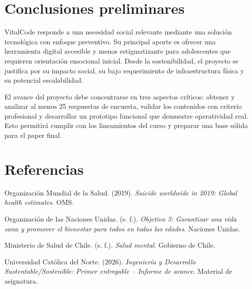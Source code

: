 \documentclass[12pt,letterpaper]{article}
\begin{document}
\section{Conclusiones preliminares}

VitalCode responde a una necesidad social relevante mediante una solución tecnológica con enfoque preventivo. Su principal aporte es ofrecer una herramienta digital accesible y menos estigmatizante para adolescentes que requieren orientación emocional inicial. Desde la sostenibilidad, el proyecto se justifica por su impacto social, su bajo requerimiento de infraestructura física y su potencial escalabilidad.

El avance del proyecto debe concentrarse en tres aspectos críticos: obtener y analizar al menos 25 respuestas de encuesta, validar los contenidos con criterio profesional y desarrollar un prototipo funcional que demuestre operatividad real. Esto permitirá cumplir con los lineamientos del curso y preparar una base sólida para el paper final.

\newpage
\section*{Referencias}

Organización Mundial de la Salud. (2019). \textit{Suicide worldwide in 2019: Global health estimates}. OMS.

Organización de las Naciones Unidas. (s. f.). \textit{Objetivo 3: Garantizar una vida sana y promover el bienestar para todos en todas las edades}. Naciones Unidas.

Ministerio de Salud de Chile. (s. f.). \textit{Salud mental}. Gobierno de Chile.

Universidad Católica del Norte. (2026). \textit{Ingeniería y Desarrollo Sustentable/Sostenible: Primer entregable -- Informe de avance}. Material de asignatura.
\end{document}

